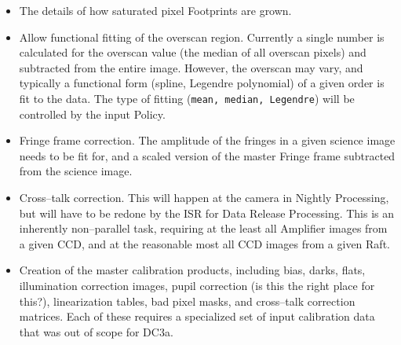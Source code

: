 \begin{itemize}

\item The details of how saturated pixel Footprints are grown.

\item Allow functional fitting of the overscan region.  Currently a
single number is calculated for the overscan value (the median of all
overscan pixels) and subtracted from the entire image.  However, the
overscan may vary, and typically a functional form (spline, Legendre
polynomial) of a given order is fit to the data.  The type of fitting
({\tt mean, median, Legendre}) will be controlled by the input Policy.

\item Fringe frame correction.  The amplitude of the fringes in a
given science image needs to be fit for, and a scaled version of the
master Fringe frame subtracted from the science image.

\item Cross--talk correction.  This will happen at the camera in
Nightly Processing, but will have to be redone by the ISR for Data
Release Processing.  This is an inherently non--parallel task,
requiring at the least all Amplifier images from a given CCD, and at
the reasonable most all CCD images from a given Raft.

\item Creation of the master calibration products, including bias,
darks, flats, illumination correction images, pupil correction (is
this the right place for this?), linearization tables, bad pixel
masks, and cross--talk correction matrices.  Each of these requires a
specialized set of input calibration data that was out of scope for
DC3a.

\end{itemize}

